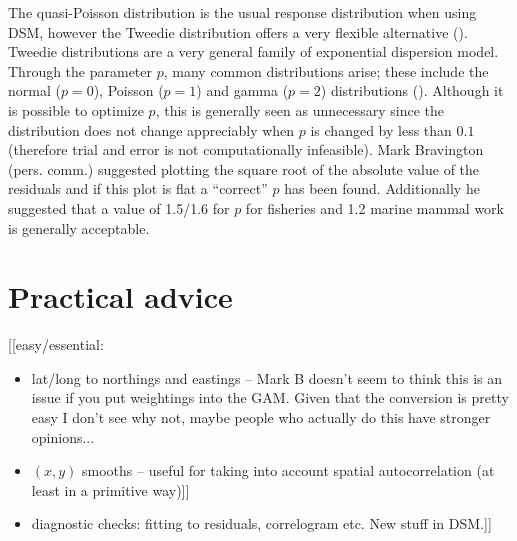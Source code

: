 \documentclass[a4paper,12pt]{article}
\begin{document}
The quasi-Poisson distribution is the usual response distribution when using DSM, however the Tweedie distribution offers a very flexible alternative (\cite{Candy:2004tb}). Tweedie distributions are a very general family of exponential dispersion model. Through the parameter $p$, many common distributions arise; these include the normal ($p=0$), Poisson ($p=1$) and gamma ($p=2$) distributions (\cite{Jorgensen:1987vg}). Although it is possible to optimize $p$, this is generally seen as unnecessary since the distribution does not change appreciably when $p$ is changed by less than $0.1$ (therefore trial and error is not computationally infeasible). Mark Bravington (pers. comm.) suggested plotting the square root of the absolute value of the residuals and if this plot is flat a ``correct'' $p$ has been found. Additionally he suggested that a value of 1.5/1.6 for $p$ for fisheries and 1.2 marine mammal work is generally acceptable.


\section*{Practical advice}
\label{s:practical}

[[easy/essential:
\begin{itemize}
\item lat/long to northings and eastings -- Mark B doesn't seem to think this is an issue if you put weightings into the GAM. Given that the conversion is pretty easy I don't see why not, maybe people who actually do this have stronger opinions...
\item $(x,y)$ smooths -- useful for taking into account spatial autocorrelation (at least in a primitive way)]]
\item diagnostic checks: fitting to residuals, correlogram etc. New stuff in DSM.]]
\end{itemize}
%
%
\end{document}
